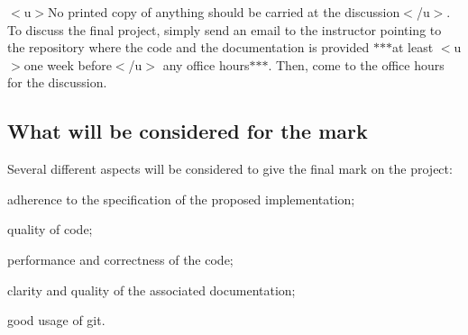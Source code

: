 $<$u$>$No printed copy of anything should be carried at the discussion$<$/u$>$. To discuss the final project, simply send an email to the instructor pointing to the repository where the code and the documentation is provided $\ast$$\ast$$\ast$at least $<$u$>$one week before$<$/u$>$ any office hours$\ast$$\ast$$\ast$. Then, come to the office hours for the discussion.

\subsection*{What will be considered for the mark}

Several different aspects will be considered to give the final mark on the project\+:


\begin{DoxyItemize}
\item adherence to the specification of the proposed implementation;
\item quality of code;
\item performance and correctness of the code;
\item clarity and quality of the associated documentation;
\item good usage of git. 
\end{DoxyItemize}